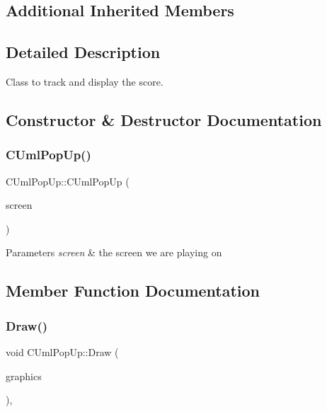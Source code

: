 \subsection*{Additional Inherited Members}


\subsection{Detailed Description}
Class to track and display the score. 

\subsection{Constructor \& Destructor Documentation}
\mbox{\label{class_c_uml_pop_up_a7bebcefec4897b52e2dda3095bb807b5}} 
\subsubsection{\texorpdfstring{CUmlPopUp()}{CUmlPopUp()}}
{\footnotesize\ttfamily C\+Uml\+Pop\+Up\+::\+C\+Uml\+Pop\+Up (\begin{DoxyParamCaption}\item[{\mbox{\hyperlink{class_c_screen}{C\+Screen}} $\ast$}]{screen }\end{DoxyParamCaption})}


\begin{DoxyParams}{Parameters}
{\em screen} & the screen we are playing on \\
\hline
\end{DoxyParams}


\subsection{Member Function Documentation}
\mbox{\label{class_c_uml_pop_up_ab9dc4616dc8b7529a69d74a9db83b3a9}} 
\subsubsection{\texorpdfstring{Draw()}{Draw()}}
{\footnotesize\ttfamily void C\+Uml\+Pop\+Up\+::\+Draw (\begin{DoxyParamCaption}\item[{Gdiplus\+::\+Graphics $\ast$}]{graphics }\end{DoxyParamCaption})\hspace{0.3cm}{\ttfamily [override]}, {\ttfamily [virtual]}}

